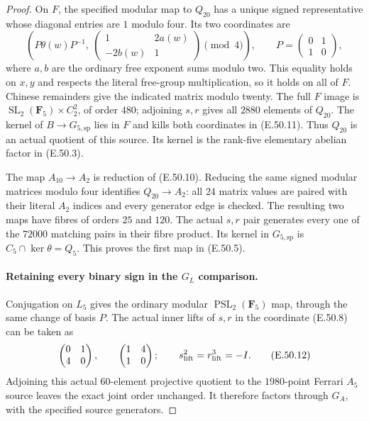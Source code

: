 \begin{proof}
On $F$, the specified modular map to $Q_{20}$ has a
unique signed representative whose diagonal entries
are $1$ modulo four.  Its two coordinates are
\[
 \left(
    P\theta(w)P^{-1},\
    \begin{pmatrix}1&2a(w)\\-2b(w)&1\end{pmatrix}\pmod4
 \right),
 \qquad
 P=\begin{pmatrix}0&1\\1&0\end{pmatrix},
 \tag{E.50.11}
\]
where $a,b$ are the ordinary free exponent sums modulo
two.  This equality holds on $x,y$ and respects the
literal free-group multiplication, so it holds on
all of $F$.  Chinese remainders give the indicated
matrix modulo twenty.  The full $F$ image is
$\operatorname{SL}_2(\mathbf F_5)\times C_2^2$, of
order $480$; adjoining $s,r$ gives all $2880$ elements
of $Q_{20}$.
The kernel of $B\to G_{5,\mathrm{sp}}$ lies in $F$
and kills both coordinates in \textup{(E.50.11)}.
Thus $Q_{20}$ is an actual quotient of this source.
Its kernel is the rank-five elementary abelian
factor in \textup{(E.50.3)}.

The map $A_{10}\to A_2$ is reduction of
\textup{(E.50.10)}.  Reducing the same signed modular
matrices modulo four identifies $Q_{20}\to A_2$:
all $24$ matrix values are paired with their literal
$A_2$ indices and every generator edge is checked.
The resulting two maps have fibres of orders $25$
and $120$.  The actual $s,r$ pair generates every
one of the $72000$ matching pairs in their fibre
product.  Its kernel in $G_{5,\mathrm{sp}}$ is
$C_5\cap\ker\theta=Q_5$.
This proves the first map in \textup{(E.50.5)}.

\paragraph{Retaining every binary sign in the $G_L$ comparison.}
Conjugation on $L_5$ gives the ordinary modular
$\operatorname{PSL}_2(\mathbf F_5)$ map, through
the same change of basis $P$.
The actual inner lifts of $s,r$ in the coordinate
\textup{(E.50.8)} can be taken as
\[
 \begin{pmatrix}0&1\\4&0\end{pmatrix},\qquad
 \begin{pmatrix}1&4\\1&0\end{pmatrix};
 \qquad s_{\rm lift}^2=r_{\rm lift}^3=-I.
 \tag{E.50.12}
\]
Adjoining this actual $60$-element projective
quotient to the $1980$-point Ferrari $A_5$ source
leaves the exact joint order unchanged.
It therefore factors through $G_A$, with the
specified source generators.


\end{proof}
